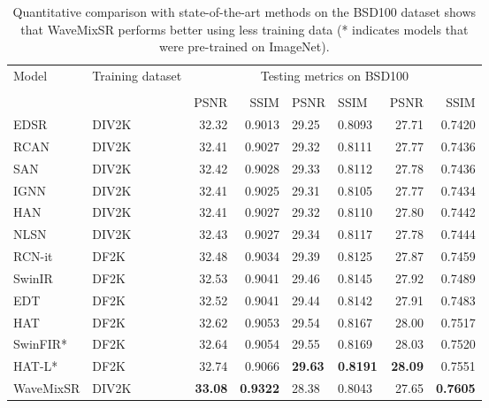 \documentclass{article}
\begin{document}
\begin{table*}[]
\centering
\begin{tabular}{@{}llrrllrr@{}}
\toprule
\multirow{2}{*}{Model} & \multirow{2}{*}{Training dataset} & \multicolumn{6}{c}{Testing metrics on BSD100} \\ \cmidrule(l){3-8} 
 &  & \multicolumn{2}{c}{} & \multicolumn{2}{c}{} & \multicolumn{2}{c}{} \\ \cmidrule(l){3-8} 
 &  & PSNR & SSIM & PSNR & SSIM & PSNR & SSIM \\ \midrule
EDSR~\cite{lim2017enhanced} & DIV2K & 32.32 & 0.9013 & 29.25 & 0.8093 & 27.71 & 0.7420 \\
RCAN~\cite{zhang2018image} & DIV2K & 32.41 & 0.9027 & 29.32 & 0.8111 & 27.77 & 0.7436 \\
SAN~\cite{Chen_2023_CVPR} & DIV2K & 32.42 & 0.9028 & 29.33 & 0.8112 & 27.78 & 0.7436 \\
IGNN~\cite{Chen_2023_CVPR} & DIV2K & 32.41 & 0.9025 & 29.31 & 0.8105 & 27.77 & 0.7434 \\
HAN~\cite{niu2020single} & DIV2K & 32.41 & 0.9027 & 29.32 & 0.8110 & 27.80 & 0.7442 \\
NLSN~\cite{Chen_2023_CVPR} & DIV2K & 32.43 & 0.9027 & 29.34 & 0.8117 & 27.78 & 0.7444 \\
RCN-it~\cite{Chen_2023_CVPR} & DF2K & 32.48 & 0.9034 & 29.39 & 0.8125 & 27.87 & 0.7459 \\
SwinIR~\cite{liang2021swinir} & DF2K & 32.53 & 0.9041 & 29.46 & 0.8145 & 27.92 & 0.7489 \\
EDT~\cite{li2022efficient} & DF2K & 32.52 & 0.9041 & 29.44 & 0.8142 & 27.91 & 0.7483 \\
HAT~\cite{Chen_2023_CVPR} & DF2K & 32.62 & 0.9053 & 29.54 & 0.8167 & 28.00 & 0.7517 \\
SwinFIR*~\cite{zhang2023swinfir} & DF2K & 32.64 & 0.9054 & 29.55 & 0.8169 & 28.03& 0.7520 \\
HAT-L*~\cite{Chen_2023_CVPR} & DF2K & 32.74 & 0.9066 & \textbf{29.63} & \textbf{0.8191} & \textbf{28.09} & 0.7551 \\
WaveMixSR & DIV2K & \textbf{33.08} & \textbf{0.9322} & 28.38 & 0.8043 & 27.65 & \textbf{0.7605} \\ \bottomrule
\end{tabular}
\caption{Quantitative comparison with state-of-the-art methods on the BSD100 dataset shows that WaveMixSR performs better using less training data (* indicates models that were pre-trained on ImageNet).}
\label{tab:bsd100}
\end{table*}
\end{document}
